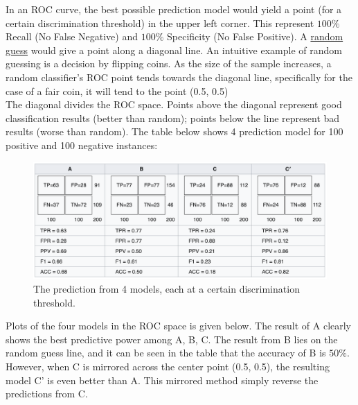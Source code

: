 In an ROC curve, the best possible prediction model would yield a point (for a certain discrimination threshold) in the upper left corner. This represent $100\%$ Recall (No False Negative) and $100\%$ Specificity (No False Positive). A \underline{random guess} would give a point along a diagonal line. An intuitive example of random guessing is a decision by flipping coins. As the size of the sample increases, a random classifier's ROC point tends towards the diagonal line, specifically for the case of a fair coin, it will tend to the point (0.5, 0.5)\\

The diagonal divides the ROC space. Points above the diagonal represent good classification results (better than random); points below the line represent bad results (worse than random). The table below shows 4 prediction model for 100 positive and 100 negative instances:

\begin{figure}[h!]
\begin{center}
	\includegraphics[scale=0.4]{roc_models.png}
	\caption[]{The prediction from 4 models, each at a certain discrimination threshold.}
	\label{precisionrecall}
	\end{center}
	\end{figure}
	
Plots of the four models in the ROC space is given below. The result of A clearly shows the best predictive power among A, B, C. The result from B lies on the random guess line, and it can be seen in the table that the accuracy of B is $50\%$. However, when C is mirrored across the center point (0.5, 0.5), the resulting model C' is even better than A. This mirrored method simply reverse the predictions from C. \\

